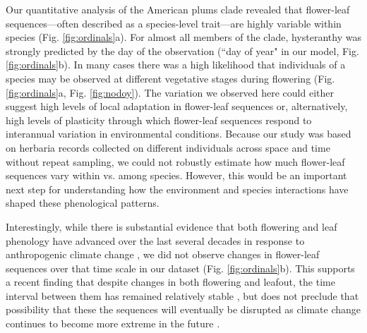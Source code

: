 \documentclass{article}[12pt]
\begin{document}
{{Our quantitative analysis of the American plums clade revealed that flower-leaf sequences---often described as a species-level trait---are highly variable within species (Fig. \ref{fig:ordinals}a). For almost all members of the clade, hysteranthy was strongly predicted by the day of the observation (``day of year" in our model, Fig. \ref{fig:ordinals}b). In many cases there was a high likelihood that individuals of a species may be observed at different vegetative stages during flowering (Fig. \ref{fig:ordinals}a, Fig. \ref{fig:nodoy}). %
The variation we observed here could either suggest high levels of local adaptation in flower-leaf sequences or, alternatively, high levels of plasticity through which flower-leaf sequences respond to interannual variation in environmental conditions. Because our study was based on herbaria records collected on different individuals across space and time without repeat sampling, we could not robustly estimate how much flower-leaf sequences vary within vs. among species. However, this would be an important next step for understanding how the environment and species interactions have shaped these phenological patterns.

Interestingly, while there is substantial evidence that both flowering and leaf phenology have advanced over the last several decades in response to anthropogenic climate change \citep{Menzel2006,Cleland2007,Augspurger:2020aa}, we did not observe changes in flower-leaf sequences over that time scale in our dataset (Fig. \ref{fig:ordinals}b). This supports a recent finding that despite changes in both flowering and leafout, the time interval between them has remained relatively stable \citep{Guo:2023wb}, but does not preclude that possibility that these the sequences will eventually be disrupted as climate change continues to become more extreme in the future \citep{Buonaiuto_2021}.

}}
\end{document}
